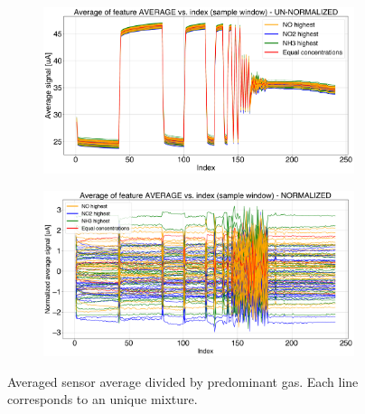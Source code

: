\begin{figure}[!htb]
	\centering
	
	\begin{subfigure}[t]{1\textwidth}
		\includegraphics[width=1\linewidth]{../figures/order1.png}
		\caption{}
		\label{fig:order1} 
	\end{subfigure}
	
	\begin{subfigure}[t]{1\textwidth}
		\includegraphics[width=1\linewidth]{../figures/order1-norm.png}
		\caption{}
		\label{fig:order1norm}
	\end{subfigure}
	
	\caption{Averaged sensor average divided by predominant gas. Each line corresponds to an unique mixture. }
	\label{fig:order1-both}
\end{figure}

